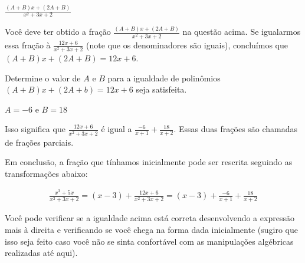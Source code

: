 \documentclass[main_estudante.tex]{subfiles}
\begin{document}

\begin{gabarito}
	\begin{gabaritoQuestao}
		$\frac{(A+B)x+(2A+B)}{x^2+3x+2}$
	\end{gabaritoQuestao}
\end{gabarito}

Você deve ter obtido a fração $\frac{(A+B)x+(2A+B)}{x^2+3x+2}$ na questão acima. Se igualarmos essa fração à $\frac{12x+6}{x^2+3x+2}$ (note que os denominadores são iguais), concluímos que $(A+B)x+(2A+B)=12x+6$.

\begin{questao}
Determine o valor de $A$ e $B$ para a igualdade de polinômios $(A+B)x+(2A+b)=12x+6$ seja satisfeita.
\end{questao}


\begin{gabarito}
	\begin{gabaritoQuestao}
		$A=-6$ e $B=18$
	\end{gabaritoQuestao}
\end{gabarito}

Isso significa que $\frac{12x+6}{x^2+3x+2}$ é igual a $\frac{-6}{x+1}+\frac{18}{x+2}$. Essas duas frações são chamadas de frações parciais.

Em conclusão, a fração que tínhamos inicialmente pode ser rescrita seguindo as transformações abaixo:

\begin{align*}
\frac{x^3+5x}{x^2+3x+2} = (x-3)+\frac{12x+6}{x^2+3x+2} = (x-3)+\frac{-6}{x+1}+\frac{18}{x+2}
\end{align*}

Você pode verificar se a igualdade acima está correta desenvolvendo a expressão mais à direita e verificando se você chega na forma dada inicialmente (sugiro que isso seja feito caso você não se sinta confortável com as manipulações algébricas realizadas até aqui).
\end{document}
